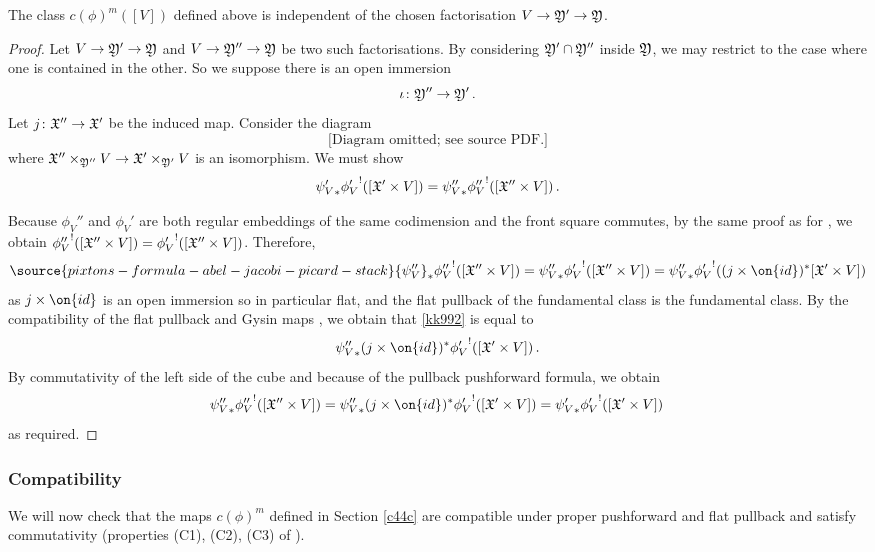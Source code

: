 \begin{lemma}
\notready\label{lem:classindepfact}
The class $c(\phi)^{m}([V])$ defined above is independent of the chosen factorisation $V \to \frak Y' \to \frak Y$.
\end{lemma}
\begin{proof}
Let $V \to \frak Y' \to \frak Y$ and $V \to \frak Y'' \to \frak Y$ be two such factorisations. By considering $\frak Y' \cap \frak Y''$ inside $\frak Y$, we may restrict to the case where one is contained in the other. So we
suppose there is an open immersion $$\iota\colon \frak Y'' \to \frak Y'\, .$$
Let $j\colon \frak X'' \to \frak X'$ be the induced map. Consider the diagram
\begin{equation}
\text{[Diagram omitted; see source PDF.]}
\end{equation}
where  $\frak X'' \times_{\frak Y''} V \to \frak X' \times_{\frak Y'} V$ is an isomorphism.
We must show
$${\psi_V'}_* {\phi_V'}^!
([\frak X' \times V]) = {\psi_V''}_* {\phi_V''}^! ([\frak X'' \times V])\, .$$

Because $\phi_V''$ and $\phi_V'$ are both regular embeddings of the same codimension and the front square commutes, by the same proof as for \cite[Theorem 6.2(c)]{Fulton1984Intersection-th}, we obtain  ${\phi_V''}^!([\frak X '' \times V]) = {\phi_V'}^!([\frak X '' \times V])$. Therefore,
\begin{equation}\label{kk992}
\source{pixtons-formula-abel-jacobi-picard-stack}
{\psi_V''}_* {\phi_V''}^! ([\frak X'' \times V]) = {\psi_V''}_* {\phi_V'}^! ([\frak X'' \times V]) = {\psi_V''}_* {\phi_V'}^! ( (j \times \on{id})^*[\frak X' \times V])
\end{equation}
as $j \times \on{id}$ is an open immersion so in particular flat, and the flat pullback of the fundamental class is the fundamental class. By the compatibility of the flat pullback and Gysin maps  \cite[Section 3.1]{Kresch1999Cycle-groups-fo}, we obtain
that \eqref{kk992} is equal to
\[{\psi_V''}_*(j \times \on{id})^* {\phi_V'}^! ([\frak X' \times V])\, .\]
By commutativity of the left side of the cube and because of the pullback pushforward formula, we obtain
\[{\psi_V''}_* {\phi_V''}^! ([\frak X'' \times V]) =  {\psi_V''}_*(j \times \on{id})^* {\phi_V'}^! ([\frak X' \times V]) = {\psi_V'}_* {\phi_V'}^! ([\frak X' \times V])\, \]
as required.
\end{proof}


\subsubsection{Compatibility} \label{c45c}
We will now check that the maps $c(\phi)^{m}$
defined in Section \ref{c44c} are
 compatible under proper pushforward and flat pullback and satisfy commutativity (properties (C1), (C2), (C3) of \cite[Section 17.1]{Fulton1984Intersection-th}).


